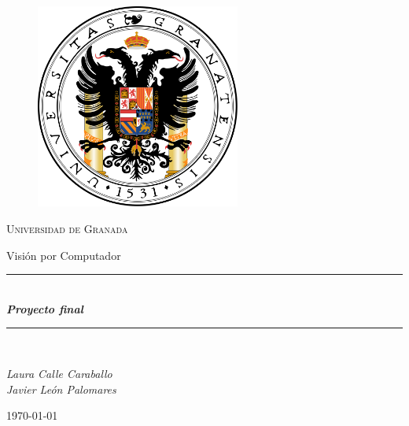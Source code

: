 \documentclass[11pt,a4paper]{article}
\newcommand{\horrule}[1]{\rule{\linewidth}{#1}}
\begin{document}
    \begin{titlepage}

        \centering

        \begin{figure}[h]

            \centering
            \includegraphics[width=0.6\textwidth]{logo-ugr.png}

        \end{figure}

        \vspace{1cm}

        {\scshape\LARGE Universidad de Granada}

        \vspace{1cm}

        {\LARGE Visión por Computador}

        \vspace{1cm}

        \horrule{0.5pt} \\[0.4cm]

        {\huge\bfseries\textit{Proyecto final}} \\

        \horrule{2pt} \\[0.5cm]

        \vspace{1cm}

        {\itshape\large Laura Calle Caraballo \\
        Javier León Palomares}

        \vfill

        {\Large\today}

    \end{titlepage}

\newpage
\end{document}
